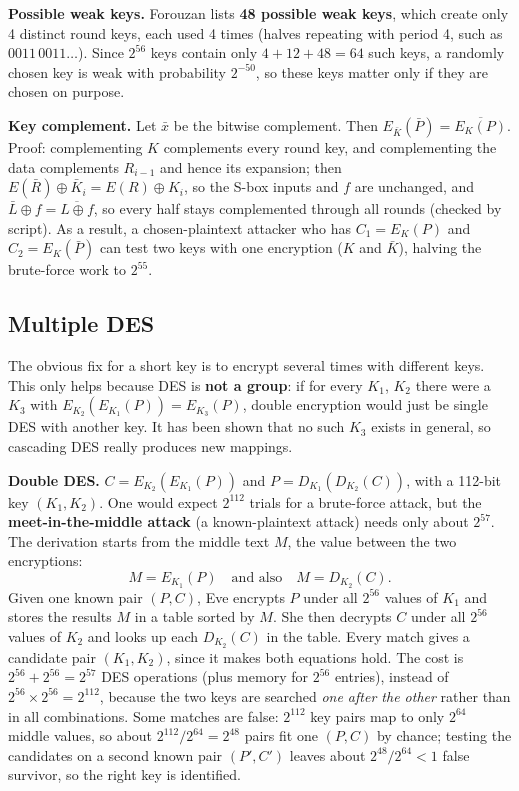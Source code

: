 \textbf{Possible weak keys.} Forouzan lists \textbf{48 possible weak keys}, which create only 4 distinct round keys, each used 4 times (halves repeating with period 4, such as $0011\,0011\dots$). Since $2^{56}$ keys contain only $4 + 12 + 48 = 64$ such keys, a randomly chosen key is weak with probability $2^{-50}$, so these keys matter only if they are chosen on purpose.

\textbf{Key complement.} Let $\bar{x}$ be the bitwise complement. Then $E_{\bar K}(\bar P) = \overline{E_K(P)}$. Proof: complementing $K$ complements every round key, and complementing the data complements $R_{i-1}$ and hence its expansion; then $E(\bar R) \oplus \bar K_i = E(R) \oplus K_i$, so the S-box inputs and $f$ are unchanged, and $\bar L \oplus f = \overline{L \oplus f}$, so every half stays complemented through all rounds (checked by script). As a result, a chosen-plaintext attacker who has $C_1 = E_K(P)$ and $C_2 = E_K(\bar P)$ can test two keys with one encryption ($K$ and $\bar K$), halving the brute-force work to $2^{55}$.

\subsection{Multiple DES \hot}
The obvious fix for a short key is to encrypt several times with different keys. This only helps because DES is \textbf{not a group}: if for every $K_1$, $K_2$ there were a $K_3$ with $E_{K_2}(E_{K_1}(P)) = E_{K_3}(P)$, double encryption would just be single DES with another key. It has been shown that no such $K_3$ exists in general, so cascading DES really produces new mappings.

\textbf{Double DES.} $C = E_{K_2}(E_{K_1}(P))$ and $P = D_{K_1}(D_{K_2}(C))$, with a 112-bit key $(K_1, K_2)$. One would expect $2^{112}$ trials for a brute-force attack, but the \textbf{meet-in-the-middle attack} (a known-plaintext attack) needs only about $2^{57}$. The derivation starts from the middle text $M$, the value between the two encryptions:
\[
M = E_{K_1}(P) \quad\text{and also}\quad M = D_{K_2}(C).
\]
Given one known pair $(P, C)$, Eve encrypts $P$ under all $2^{56}$ values of $K_1$ and stores the results $M$ in a table sorted by $M$. She then decrypts $C$ under all $2^{56}$ values of $K_2$ and looks up each $D_{K_2}(C)$ in the table. Every match gives a candidate pair $(K_1, K_2)$, since it makes both equations hold. The cost is $2^{56} + 2^{56} = 2^{57}$ DES operations (plus memory for $2^{56}$ entries), instead of $2^{56} \times 2^{56} = 2^{112}$, because the two keys are searched \emph{one after the other} rather than in all combinations. Some matches are false: $2^{112}$ key pairs map to only $2^{64}$ middle values, so about $2^{112}/2^{64} = 2^{48}$ pairs fit one $(P, C)$ by chance; testing the candidates on a second known pair $(P', C')$ leaves about $2^{48}/2^{64} < 1$ false survivor, so the right key is identified. 

